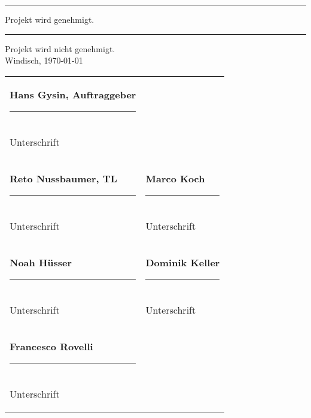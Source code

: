 
\rule{10mm}{0.05em} Projekt wird genehmigt. \hspace{20mm} \rule{10mm}{0.05em} Projekt wird nicht genehmigt.\\

Windisch, \today \\

\begin{tabular}{p{80mm}p{80mm}}
    \parbox[t][][t]{55mm}{
        \textbf{Hans Gysin, Auftraggeber}
        \vspace*{10mm} \\
        \rule{70mm}{0.05em} \\
        Unterschrift
    } \\
    [30mm]

    \parbox[t][][t]{55mm}{
        \textbf{Reto Nussbaumer, TL}
        \vspace*{10mm} \\
        \rule{70mm}{0.05em} \\
        Unterschrift \\
    }

    &

    \parbox[t][][t]{55mm}{
        \textbf{Marco Koch}
        \vspace*{10mm} \\
        \rule{70mm}{0.05em} \\
        Unterschrift \\
    } \\
    [10mm]

    \parbox[t][][t]{55mm}{
        \textbf{Noah H\"usser}
        \vspace*{10mm} \\
        \rule{70mm}{0.05em} \\
        Unterschrift \\
    }

    &

    \parbox[t][][t]{55mm}{
        \textbf{Dominik Keller}
        \vspace*{10mm} \\
        \rule{70mm}{0.05em} \\
        Unterschrift \\
    } \\
    [10mm]

    \parbox[t][][t]{55mm}{
        \textbf{Francesco Rovelli}
        \vspace*{10mm} \\
        \rule{70mm}{0.05em} \\
        Unterschrift
    }


\end{tabular}
